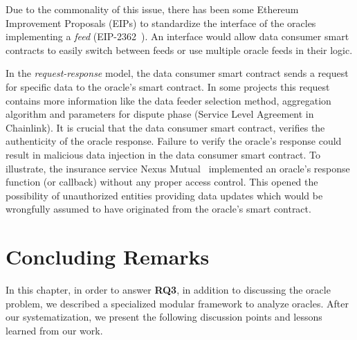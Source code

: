 Due to the commonality of this issue, there has been some Ethereum Improvement Proposals (EIPs) to standardize the interface of the oracles implementing a \textit{feed} (\eg EIP-2362~\cite{eip2362}). An interface would allow data consumer smart contracts to easily switch between feeds or use multiple oracle feeds in their logic. 

In the \textit{request-response} model, the data consumer smart contract sends a request for specific data to the oracle's smart contract. In some projects this request contains more information like the data feeder selection method, aggregation algorithm and parameters for dispute phase (\eg Service Level Agreement in Chainlink). It is crucial that the data consumer smart contract, verifies the authenticity of the oracle response. Failure to verify the oracle's response could result in malicious data injection in the data consumer smart contract. To illustrate, the insurance service Nexus Mutual~\cite{nexusmutualbug} implemented an oracle's response function (or callback) without any proper access control. This opened the possibility of unauthorized entities providing data updates which would be wrongfully assumed to have originated from the oracle's smart contract. 



\section{Concluding Remarks}
In this chapter, in order to answer \textbf{RQ3}, in addition to discussing the oracle problem, we described a specialized modular framework to analyze oracles. After our systematization, we present the following discussion points and lessons learned from our work. 

